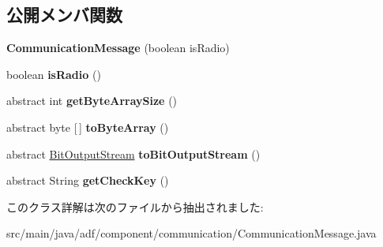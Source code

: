 \subsection*{公開メンバ関数}
\begin{DoxyCompactItemize}
\item 
\hypertarget{classadf_1_1component_1_1communication_1_1CommunicationMessage_ac68a1589b60d7add1bde025ff02b64b3}{}\label{classadf_1_1component_1_1communication_1_1CommunicationMessage_ac68a1589b60d7add1bde025ff02b64b3} 
{\bfseries Communication\+Message} (boolean is\+Radio)
\item 
\hypertarget{classadf_1_1component_1_1communication_1_1CommunicationMessage_a353c19a8d7c6e052b1d50f580fe91cc6}{}\label{classadf_1_1component_1_1communication_1_1CommunicationMessage_a353c19a8d7c6e052b1d50f580fe91cc6} 
boolean {\bfseries is\+Radio} ()
\item 
\hypertarget{classadf_1_1component_1_1communication_1_1CommunicationMessage_a8d2694b5356bdd5126cc540b3f9f2f3a}{}\label{classadf_1_1component_1_1communication_1_1CommunicationMessage_a8d2694b5356bdd5126cc540b3f9f2f3a} 
abstract int {\bfseries get\+Byte\+Array\+Size} ()
\item 
\hypertarget{classadf_1_1component_1_1communication_1_1CommunicationMessage_a4b489e72be7259f0a61c1b85cce7f78b}{}\label{classadf_1_1component_1_1communication_1_1CommunicationMessage_a4b489e72be7259f0a61c1b85cce7f78b} 
abstract byte \mbox{[}$\,$\mbox{]} {\bfseries to\+Byte\+Array} ()
\item 
\hypertarget{classadf_1_1component_1_1communication_1_1CommunicationMessage_a35b04bf2a77eda6aba6070a02f4c26d3}{}\label{classadf_1_1component_1_1communication_1_1CommunicationMessage_a35b04bf2a77eda6aba6070a02f4c26d3} 
abstract \hyperlink{classadf_1_1component_1_1communication_1_1util_1_1BitOutputStream}{Bit\+Output\+Stream} {\bfseries to\+Bit\+Output\+Stream} ()
\item 
\hypertarget{classadf_1_1component_1_1communication_1_1CommunicationMessage_a64aef75735f3b938169ccc708a442dc0}{}\label{classadf_1_1component_1_1communication_1_1CommunicationMessage_a64aef75735f3b938169ccc708a442dc0} 
abstract String {\bfseries get\+Check\+Key} ()
\end{DoxyCompactItemize}


このクラス詳解は次のファイルから抽出されました\+:\begin{DoxyCompactItemize}
\item 
src/main/java/adf/component/communication/Communication\+Message.\+java\end{DoxyCompactItemize}
